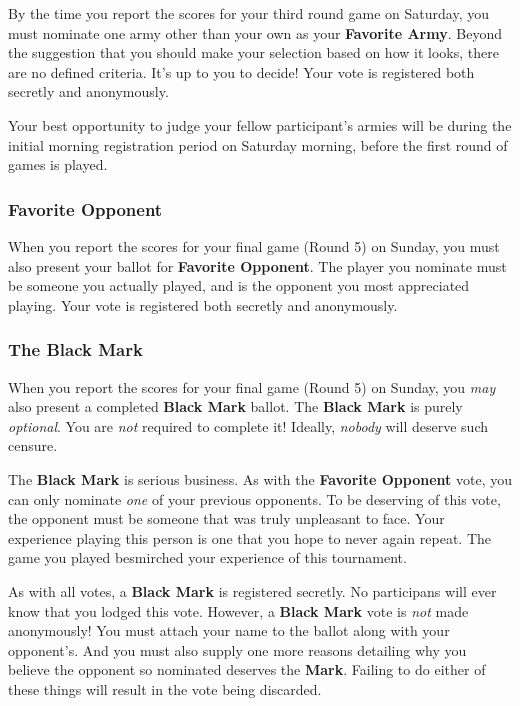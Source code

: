 \documentclass[12pt,titlepage]{article}
\begin{document}
By the time you report the scores for your third round game on Saturday, you must nominate one army other than your own as your \textbf{Favorite Army}. Beyond the suggestion that you should make your selection based on how it looks, there are no defined criteria. It's up to you to decide! Your vote is registered both secretly and anonymously.

Your best opportunity to judge your fellow participant's armies will be during the initial morning registration period on Saturday morning, before the first round of games is played.

\subsubsection*{Favorite Opponent}

When you report the scores for your final game (Round 5) on Sunday, you must also present your ballot for \textbf{Favorite Opponent}. The player you nominate must be someone you actually played, and is the opponent you most appreciated playing. Your vote is registered both secretly and anonymously.

\subsubsection*{The Black Mark}

When you report the scores for your final game (Round 5) on Sunday, you \textit{may} also present a completed \textbf{Black Mark} ballot. The \textbf{Black Mark} is purely \textit{optional}. You are \textit{not} required to complete it! Ideally, \textit{nobody} will deserve such censure.

The \textbf{Black Mark} is serious business. As with the \textbf{Favorite Opponent} vote, you can only nominate \textit{one} of your previous opponents. To be deserving of this vote, the opponent must be someone that was truly unpleasant to face. Your experience playing this person is one that you hope to never again repeat. The game you played besmirched your experience of this tournament.

As with all votes, a \textbf{Black Mark} is registered secretly. No participans will ever know that you lodged this vote. However, a \textbf{Black Mark} vote is \textit{not} made anonymously! You must attach your name to the ballot along with your opponent's. And you must also supply one more reasons detailing why you believe the opponent so nominated deserves the \textbf{Mark}. Failing to do either of these things will result in the vote being discarded.
\end{document}
